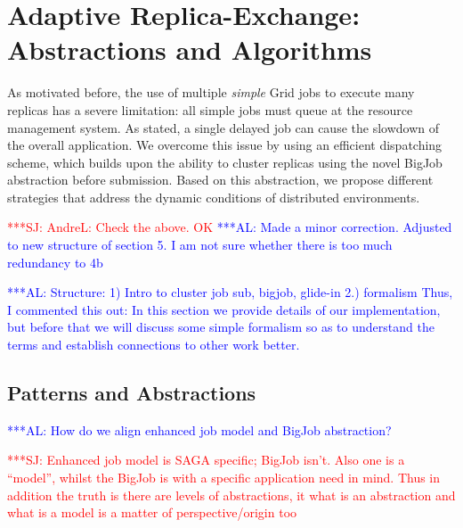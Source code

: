 \documentclass{rspublic}
\newcommand{\alnote}[1]{ {\textcolor{blue} { ***AL: #1 }}}
\newcommand{\jhanote}[1]{ {\textcolor{red} { ***SJ: #1 }}}
\newcommand{\alnote}[1]{}
\newcommand{\jhanote}[1]{}
\begin{document}
\section{Adaptive Replica-Exchange: Abstractions and Algorithms}
\label{sec:glidein}

As motivated before, the use of multiple {\it simple} Grid jobs to
execute many replicas has a severe limitation: all simple jobs must
queue at the resource management system. As stated, a single 
delayed job can cause the slowdown of the overall application. 
We overcome this issue by using an efficient dispatching scheme, 
which builds upon the ability to cluster replicas using the novel 
BigJob abstraction before submission. Based on this abstraction, we
propose different strategies that address the dynamic conditions
of distributed environments. 

\jhanote{AndreL: Check the above. OK}
\alnote{Made a minor correction. Adjusted to new structure of section 5. I
am not sure whether there is too much redundancy to 4b}


  \alnote{Structure: 1) Intro to cluster job sub, bigjob, glide-in 2.)
    formalism Thus, I commented this out: In this section we provide
    details of our implementation, but before that we will discuss
    some simple formalism so as to understand the terms and establish
    connections to other work better.  }

               
\subsection{Patterns and Abstractions}
\alnote{How do we align enhanced job model and BigJob abstraction?}

\jhanote{Enhanced job model is SAGA specific; BigJob isn't. Also one
  is a ``model'', whilst the BigJob is with a specific application
  need in mind. Thus in addition the truth is there are levels of
  abstractions, it what is an abstraction and what is a model is a
  matter of perspective/origin too}              
\end{document}
